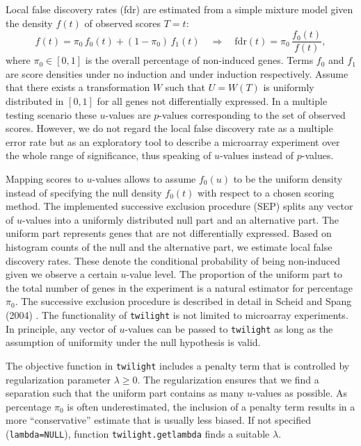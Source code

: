\documentclass[11pt,a4paper,fleqn]{report}
\newcommand{\Rfunction}[1]{{\texttt{#1}}}
\newcommand{\Rfunarg}[1]{{\texttt{#1}}}
\begin{document}
Local false discovery rates (fdr) are estimated from a simple mixture model given the density $f(t)$ of observed scores $T=t$:
\begin{equation}
f(t) = \pi_0 \, f_0(t) + (1-\pi_0) \, f_1(t) \quad \Rightarrow \quad \mbox{fdr}(t)=\pi_0 \, \frac{f_0(t)}{f(t)},
\end{equation}
where $\pi_0 \in [0,1]$ is the overall percentage of non-induced genes. Terms $f_0$ and $f_1$ are score densities under no induction and under induction respectively. Assume that there exists a transformation $W$ such that $U=W(T)$ is uniformly distributed in $[0,1]$ for all genes not differentially expressed. In a multiple testing scenario these $u$-values are $p$-values corresponding to the set of observed scores. However, we do not regard the local false discovery rate as a multiple error rate but as an exploratory tool to describe a microarray experiment over the whole range of significance, thus speaking of $u$-values instead of $p$-values.

Mapping scores to $u$-values allows to assume $f_0(u)$ to be the uniform density instead of specifying the null density $f_0(t)$ with respect to a chosen scoring method. The implemented successive exclusion procedure (SEP) splits any vector of $u$-values into a uniformly distributed null part and an alternative part. The uniform part represents genes that are not differentially expressed. Based on histogram counts of the null and the alternative part, we estimate local false discovery rates. These denote the conditional probability of being non-induced given we observe a certain $u$-value level. The proportion of the uniform part to the total number of genes in the experiment is a natural estimator for percentage $\pi_0$. The successive exclusion procedure is described in detail in Scheid and Spang (2004) \cite{scheid04}. The functionality of \Rfunction{twilight} is not limited to microarray experiments. In principle, any vector of $u$-values can be passed to \Rfunction{twilight} as long as the assumption of uniformity under the null hypothesis is valid.


The objective function in \Rfunction{twilight} includes a penalty term that is controlled by regularization parameter $\lambda \geq 0$. The regularization ensures that we find a separation such that the uniform part contains as many $u$-values as possible. As percentage $\pi_0$ is often underestimated, the inclusion of a penalty term results in a more ``conservative'' estimate that is usually less biased. If not specified (\Rfunarg{lambda=NULL}), function \Rfunction{twilight.getlambda} finds a suitable $\lambda$.
\end{document}
